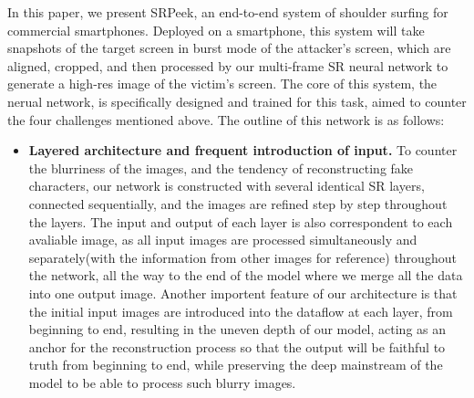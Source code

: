 In this paper, we present \textsf{SRPeek}, an end-to-end system of shoulder surfing for commercial smartphones. Deployed on a smartphone, this system will take snapshots of the target screen in burst mode of the attacker's screen, which are aligned, cropped, and then processed by our multi-frame SR neural network to generate a high-res image of the victim's screen. The core of this system, the nerual network, is specifically designed and trained for this task, aimed to counter the four challenges mentioned above. The outline of this network is as follows:
\begin{itemize}[leftmargin=*]
  \item \textbf{Layered architecture and frequent introduction of input.} To counter the blurriness of the images, and the tendency of reconstructing fake characters, our network is constructed with several identical SR layers, connected sequentially, and the images are refined step by step throughout the layers. The input and output of each layer is also correspondent to each avaliable image, as all input images are processed simultaneously and separately(with the information from other images for reference) throughout the network, all the way to the end of the model where we merge all the data into one output image. Another importent feature of our architecture is that the initial input images are introduced into the dataflow at each layer, from beginning to end, resulting in the uneven depth of our model, acting as an anchor for the reconstruction process so that the output will be faithful to truth from beginning to end, while preserving the deep mainstream of the model to be able to process such blurry images.

\end{itemize}
